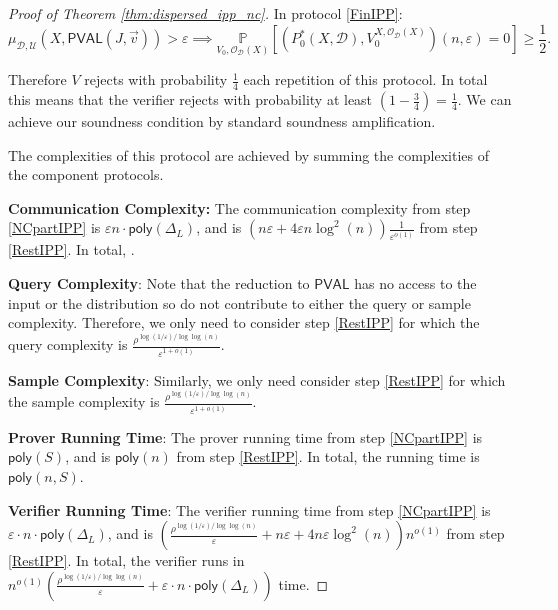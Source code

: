 \documentclass[10pt,a4paper]{article}
\newcommand{\poly}{\mathsf{poly}}
\newcommand{\PVAL}{\mathsf{PVAL}}
\newcommand{\sD}{\mathcal{D}}
\begin{document}
\begin{proof}[Proof of Theorem \ref{thm:dispersed_ipp_nc}]
In protocol \ref{FinIPP}:
\begin{equation*}
    \mu_{\sD,\mathcal{U}}(X,\PVAL(J,\vec{v}))>\varepsilon\implies \underset{V_{0},\mathcal{O}_{\mathcal{D}}(X)}{\mathbb{P}}\left[(P^{\ast}_{0}(X,\sD),V_{0}^{X,\mathcal{O}_{\sD}(X)})(n,\varepsilon)=0\right]\geq \frac{1}{2}.
\end{equation*}

Therefore $V$ rejects with probability $\frac{1}{4}$ each repetition of this protocol. In total this means that the verifier rejects with probability at least $\left(1-\frac{3}{4}\right)=\frac{1}{4}$. We can achieve our soundness condition by standard soundness amplification. 

The complexities of this protocol are achieved by summing the complexities of the component protocols. 

\vspace{0.1in}
\textbf{Communication Complexity:} The communication complexity from step \ref{NCpartIPP} is $\varepsilon n \cdot \poly(\Delta_{L})$, and is $(n\varepsilon+4\varepsilon n\log^{2} (n))\frac{1}{\varepsilon^{o(1)}}$ from step \ref{RestIPP}. In total, \sloppy{$c(n) =  (\varepsilon\cdot n+4\varepsilon n \log^{2}(n)) \frac{1}{\varepsilon}^{o(1)}+\varepsilon\cdot n\cdot \poly(\Delta_{L}) $}.

\vspace{0.1in}
\textbf{Query Complexity}: Note that the reduction to $\PVAL$ has no access to the input or the distribution so do not contribute to either the query or sample complexity. Therefore, we only need to consider step \ref{RestIPP} for which the query complexity is $\frac{\rho^{\log (1/\varepsilon)/\log\log (n)}}{\varepsilon^{1+o(1)}}$.

\vspace{0.1in}
\textbf{Sample Complexity}: Similarly, we only need consider step \ref{RestIPP} for which the sample complexity is $\frac{\rho^{\log (1/\varepsilon)/\log\log (n)}}{\varepsilon^{1+o(1)}}$.

\vspace{0.1in}
\textbf{Prover Running Time}: The prover running time from step \ref{NCpartIPP} is $\poly(S)$, and is $\poly(n)$ from step \ref{RestIPP}. In total,  the running time is $\poly(n,S)$.

\vspace{0.1in}
\textbf{Verifier Running Time}: The verifier running time from step \ref{NCpartIPP} is $\varepsilon\cdot n\cdot\poly(\Delta_{L})$, and is $\left( \frac{\rho^{\log (1/\varepsilon)/\log\log (n)}}{\varepsilon}+n\varepsilon + 4n\varepsilon \log^{2} (n) \right) n^{o(1)}$ from step \ref{RestIPP}. In total, the verifier runs in $n^{o(1)} \left( \frac{\rho^{\log (1/\varepsilon)/\log\log (n)}}{\varepsilon}+\varepsilon\cdot n\cdot\poly(\Delta_{L}) \right)$ time.


\end{proof}
\end{document}
